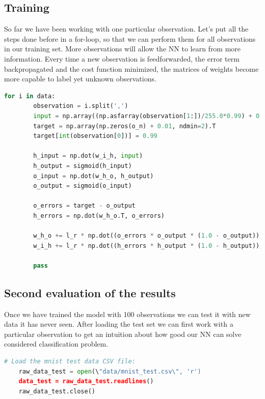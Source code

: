 \subsection{Training}

So far we have been working with one particular observation. Let's put all the steps done before in a for-loop, so that we can perform them for all observations in our training set. More observations will allow the NN to learn from more information. Every time a new observation is feedforwarded, the error term backpropagated and the cost function minimized, the matrices of weights become more capable to label yet unknown observations.

\begin{lstlisting}[language=Python]
    for i in data:
        observation = i.split(',')
        input = np.array((np.asfarray(observation[1:])/255.0*0.99) + 0.01, ndmin=2).T
        target = np.array(np.zeros(o_n) + 0.01, ndmin=2).T
        target[int(observation[0])] = 0.99
    
        h_input = np.dot(w_i_h, input)
        h_output = sigmoid(h_input)
        o_input = np.dot(w_h_o, h_output)
        o_output = sigmoid(o_input)
    
        o_errors = target - o_output
        h_errors = np.dot(w_h_o.T, o_errors)
        
        w_h_o += l_r * np.dot((o_errors * o_output * (1.0 - o_output)), np.transpose(h_output))
        w_i_h += l_r * np.dot((h_errors * h_output * (1.0 - h_output)), np.transpose(input))
    
        pass
\end{lstlisting}

\subsection{Second evaluation of the results}
   
Once we have trained the model with 100 observations we can test it with new data it has never seen. After loading the test set we can first work with a particular observation to get an intuition about how good our NN can solve considered classification problem.

\begin{lstlisting}[language=Python]
    # Load the mnist test data CSV file:
    raw_data_test = open(\"data/mnist_test.csv\", 'r')
    data_test = raw_data_test.readlines()
    raw_data_test.close()
\end{lstlisting}

